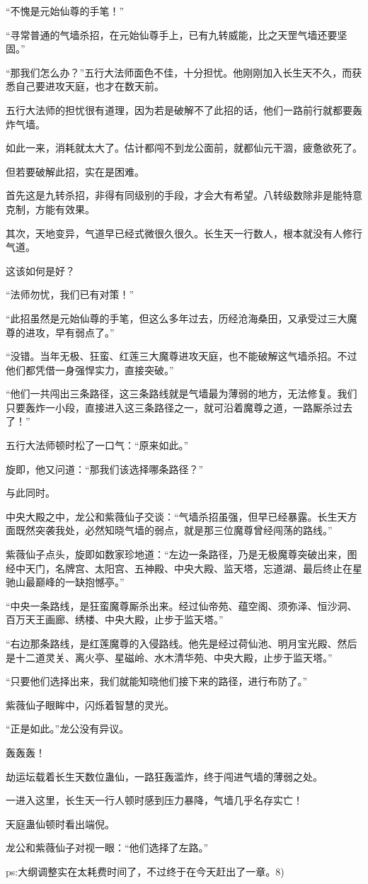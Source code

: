 \begin{this_body}
“不愧是元始仙尊的手笔！”

“寻常普通的气墙杀招，在元始仙尊手上，已有九转威能，比之天罡气墙还要坚固。”

“那我们怎么办？”五行大法师面色不佳，十分担忧。他刚刚加入长生天不久，而获悉自己要进攻天庭，也才在数天前。

五行大法师的担忧很有道理，因为若是破解不了此招的话，他们一路前行就都要轰炸气墙。

如此一来，消耗就太大了。估计都闯不到龙公面前，就都仙元干涸，疲惫欲死了。

但若要破解此招，实在是困难。

首先这是九转杀招，非得有同级别的手段，才会大有希望。八转级数除非是能特意克制，方能有效果。

其次，天地变异，气道早已经式微很久很久。长生天一行数人，根本就没有人修行气道。

这该如何是好？

“法师勿忧，我们已有对策！”

“此招虽然是元始仙尊的手笔，但这么多年过去，历经沧海桑田，又承受过三大魔尊的进攻，早有弱点了。”

“没错。当年无极、狂蛮、红莲三大魔尊进攻天庭，也不能破解这气墙杀招。不过他们都凭借一身强悍实力，直接突破。”

“他们一共闯出三条路径，这三条路线就是气墙最为薄弱的地方，无法修复。我们只要轰炸一小段，直接进入这三条路径之一，就可沿着魔尊之道，一路厮杀过去了！”

五行大法师顿时松了一口气：“原来如此。”

旋即，他又问道：“那我们该选择哪条路径？”

与此同时。

中央大殿之中，龙公和紫薇仙子交谈：“气墙杀招虽强，但早已经暴露。长生天方面既然突袭我处，必然知晓气墙的弱点，就是那三位魔尊曾经闯荡的路线。”

紫薇仙子点头，旋即如数家珍地道：“左边一条路径，乃是无极魔尊突破出来，图经中天门，名牌宫、太阳宫、五神殿、中央大殿、监天塔，忘道湖、最后终止在星驰山最巅峰的一缺抱憾亭。”

“中央一条路线，是狂蛮魔尊厮杀出来。经过仙帝苑、蕴空阁、须弥泽、恒沙洞、百万天王画廊、绣楼、中央大殿，止步于监天塔。”

“右边那条路线，是红莲魔尊的入侵路线。他先是经过荷仙池、明月宝光殿、然后是十二道灵关、离火亭、星磁岭、水木清华苑、中央大殿，止步于监天塔。”

“只要他们选择出来，我们就能知晓他们接下来的路径，进行布防了。”

紫薇仙子眼眸中，闪烁着智慧的灵光。

“正是如此。”龙公没有异议。

轰轰轰！

劫运坛载着长生天数位蛊仙，一路狂轰滥炸，终于闯进气墙的薄弱之处。

一进入这里，长生天一行人顿时感到压力暴降，气墙几乎名存实亡！

天庭蛊仙顿时看出端倪。

龙公和紫薇仙子对视一眼：“他们选择了左路。”

ps:大纲调整实在太耗费时间了，不过终于在今天赶出了一章。8)

\end{this_body}

